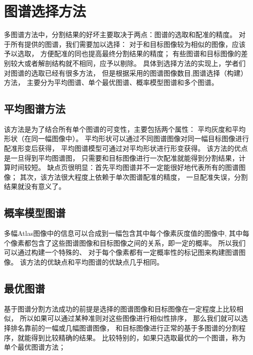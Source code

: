 



\section{图谱选择方法}%
多图谱方法中，分割结果的好坏主要取决于两点：图谱的选取和配准的精度。
对于所有提供的图谱，我们需要加以选择：
对于和目标图像较为相似的图像，应该予以选取，
方便配准的同也提高最终分割结果的精度；
有些图谱和目标图像的差别较大或者解剖结构就不相同，应予以剔除。
具体到选择方法的实现上，学者们对图谱的选取已经有很多方法，
但是根据采用的图谱图像数目,图谱选择（构建）方法，
主要分为平均图谱、单个最优图谱、概率模型图谱和多个图谱。

\subsection{平均图谱方法}
该方法是为了结合所有单个图谱的可变性，主要包括两个属性：
平均灰度和平均形状（在同一幅图像中）。
平均形状可以通过不同图谱图像对同一幅目标图像进行配准形变后获得，
平均图谱模型可通过对平均形状进行形变获得。
该方法的优点是一旦得到平均图谱图，
只需要和目标图像进行一次配准就能得到分割结果，计算时间较短。
缺点页很明显：首先平均图谱并不一定能很好地代表所有的图谱图像；
其次，该方法很大程度上依赖于单次图谱配准的精度，
一旦配准失误，分割结果就没有意义了。

\subsection{概率模型图谱}
多幅Atlas图像中的信息可以合成到一幅包含其中每个像素灰度值的图像中,
其中每个像素都包含了这些图谱图像和目标图像之间的关系，即一定的概率。
所以我们可以通过构建一个特殊的、
对于每个像素都有一定概率性的标记图来构建图谱图像。
该方法的优缺点和平均图谱的优缺点几乎相同。

\subsection{最优图谱}
基于图谱分割方法成功的前提是选择的图谱图像和目标图像在一定程度上比较相似，
所以如果可以通过某种准则对这些图像进行相似性排序，
那么我们就可以选择排名靠前的一幅或几幅图谱图像，
和目标图像进行正常的基于多图谱的分割程序，就能得到比较精确的结果。
比较特别的，如果只选取最优的一个图谱，称为单个最优图谱方法；

